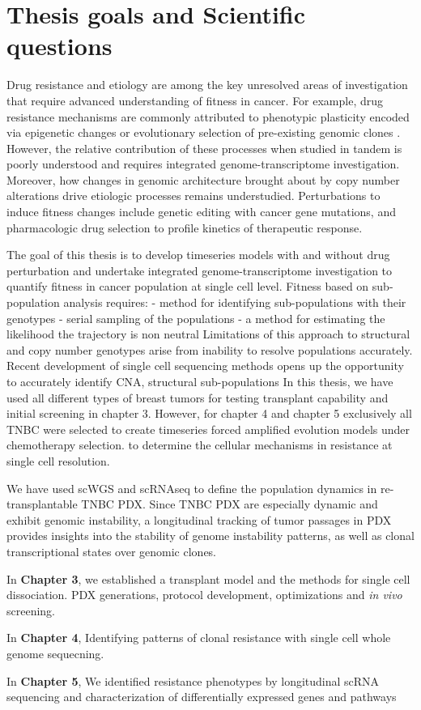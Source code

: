 \section{Thesis goals and Scientific questions}
Drug resistance and etiology are among the key unresolved areas of investigation that require advanced understanding of fitness in cancer. For example, drug resistance mechanisms are commonly attributed to phenotypic plasticity encoded via epigenetic changes \cite{shaffer2017rare,sun2014reversible} or evolutionary selection of pre-existing genomic clones \cite{vasan2019view}. However, the relative contribution of these processes when  studied  in  tandem  is  poorly  understood  and  requires  integrated  genome-transcriptome investigation.   Moreover,  how  changes  in  genomic  architecture  brought  about  by  copy  number alterations drive etiologic processes remains understudied. Perturbations to induce fitness changes include genetic editing with cancer gene mutations, and pharmacologic drug selection to profile kinetics of therapeutic response.

The goal of this thesis is to develop timeseries models with and without  drug perturbation and undertake integrated  genome-transcriptome investigation to quantify fitness in cancer population at single cell level. 
Fitness based on sub-population analysis requires:
- method for identifying sub-populations with their genotypes
- serial sampling of the populations
- a method for estimating the likelihood the trajectory is non neutral
Limitations of this approach to structural and copy number genotypes arise from inability to resolve populations accurately.
Recent development of single cell sequencing methods opens up the opportunity to accurately identify \ac{CNA}, structural sub-populations
In this thesis, we have used all different types of breast tumors for testing transplant capability and initial screening in chapter 3.  However, for chapter 4 and chapter 5 exclusively all \ac{TNBC} were selected to create timeseries forced amplified evolution models under chemotherapy selection.
to determine the cellular mechanisms in resistance  at single cell resolution.

 We have used \ac{scWGS} and \ac{scRNAseq} to define the population dynamics in re-transplantable TNBC PDX.
 Since TNBC PDX are especially dynamic and exhibit genomic instability, a longitudinal tracking of tumor passages in PDX provides insights into the stability of genome instability patterns, as well as clonal transcriptional states over genomic clones.
 
 In \textbf{Chapter 3}, we established a transplant model and the methods for single cell dissociation. PDX generations, protocol development, optimizations and \textit{in vivo} screening. 
 
 In \textbf{Chapter 4}, Identifying patterns of clonal resistance with single cell whole genome sequecning. 
 
 In \textbf{Chapter 5}, We identified resistance phenotypes by longitudinal scRNA sequencing and characterization of differentially  expressed genes and pathways 


